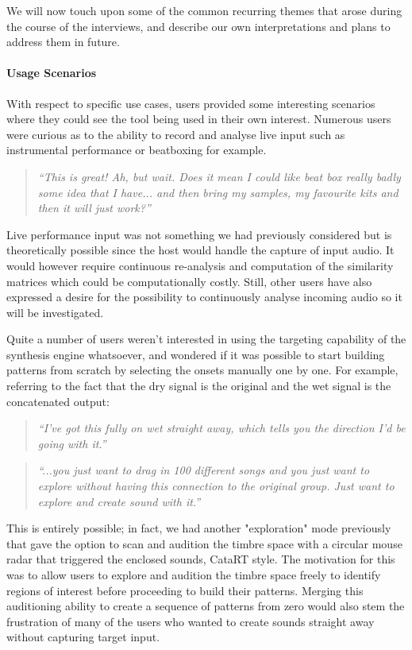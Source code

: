 We will now touch upon some of the common recurring themes that arose during the course of the interviews, and describe our own interpretations and plans to address them in future.

\paragraph{Usage Scenarios}

With respect to specific use cases, users provided some interesting scenarios where they could see the tool being used in their own interest. Numerous users were curious as to the ability to record and analyse live input such as instrumental performance or beatboxing for example.

\blockquote{\textit{“This is great! Ah, but wait. Does it mean I could like beat box really badly some idea that I have... and then bring my samples, my favourite kits and then it will just work?”}}

Live performance input was not something we had previously considered but is theoretically possible since the host would handle the capture of input audio. It would however require continuous re-analysis and computation of the similarity matrices which could be computationally costly. Still, other users have also expressed a desire for the possibility to continuously analyse incoming audio so it will be investigated.

Quite a number of users weren't interested in using the targeting capability of the synthesis engine whatsoever, and wondered if it was possible to start building patterns from scratch by selecting the onsets manually one by one. For example, referring to the fact that the dry signal is the original and the wet signal is the concatenated output:

\blockquote{\textit{ “I've got this fully on wet straight away, which tells you the direction I'd be going with it.”}}

\blockquote{\textit{“...you just want to drag in 100 different songs and you just want to explore without having this connection to the original group. Just want to explore and create sound with it.”}}

This is entirely possible; in fact, we had another "exploration" mode previously that gave the option to scan and audition the timbre space with a circular mouse radar that triggered the enclosed sounds, CataRT style. The motivation for this was to allow users to explore and audition the timbre space freely to identify regions of interest before proceeding to build their patterns. Merging this auditioning ability to create a sequence of patterns from zero would  also stem the frustration of many of the users who wanted to create sounds straight away without capturing target input.

